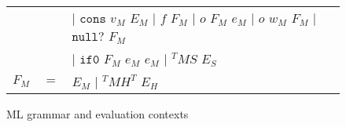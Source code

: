 \begin{figure}[p]
\begin{tabular}{lcl}
&& $\vert$ $\mathtt{cons}$ $v_{M}$ $E_{M}$ $\vert$ $f$ $F_{M}$ $\vert$ $o$ $F_{M}$ $e_{M}$ $\vert$ $o$ $w_{M}$ $F_{M}$ $\vert$ $\mathtt{null?}$ $F_{M}$ \\

\vspace{5pt}

&& $\vert$ $\mathtt{if0}$ $F_{M}$ $e_{M}$ $e_{M}$ $\vert$ $^{T}MS$ $E_{S}$ \\

\vspace{5pt}

$F_{M}$ & $=$ & $E_{M}$ $\vert$ $^{T}MH^{T}$ $E_{H}$
\end{tabular}
\caption{ML grammar and evaluation contexts}
\label{mg}
\end{figure}